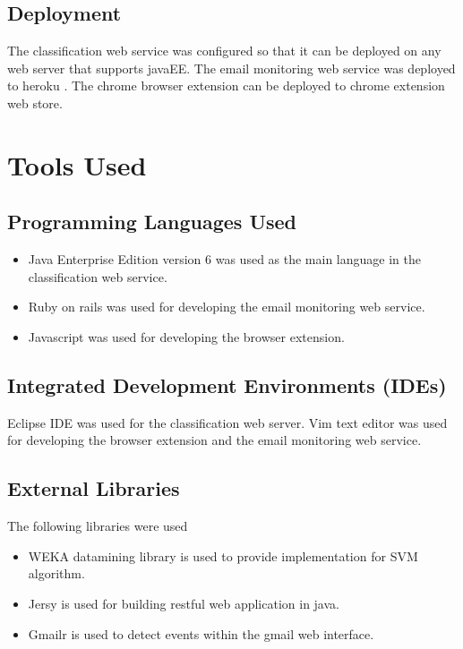 \subsection{Deployment}
The classification web service was configured so that it can be deployed on any 
web server that supports javaEE. The email monitoring web service was deployed 
to heroku \cite{HEROKU}. The chrome browser extension can be deployed to chrome 
extension web store.

\section{Tools Used}
\label{sec:5_tools_used}

\subsection{Programming Languages Used}
\begin{itemize}
  \item Java Enterprise Edition version 6 was used as the main language in the 
  classification web service.
  \item Ruby on rails \cite{ROR} was used for developing the email monitoring 
  web service.
  \item Javascript was used for developing the browser extension.
\end{itemize}

\subsection{Integrated Development Environments (IDEs)}
Eclipse IDE was used for the classification web server.
Vim text editor was used for developing the browser extension and the email 
monitoring web service.

\subsection{External Libraries}
The following libraries were used
\begin{itemize}
  \item WEKA \cite{WEKA} datamining library is used to provide implementation for SVM algorithm.
  \item Jersy \cite{JERSY} is used for building restful web application in java.
  \item Gmailr \cite{GMAILR} is used to detect events within the gmail web interface.
\end{itemize}


